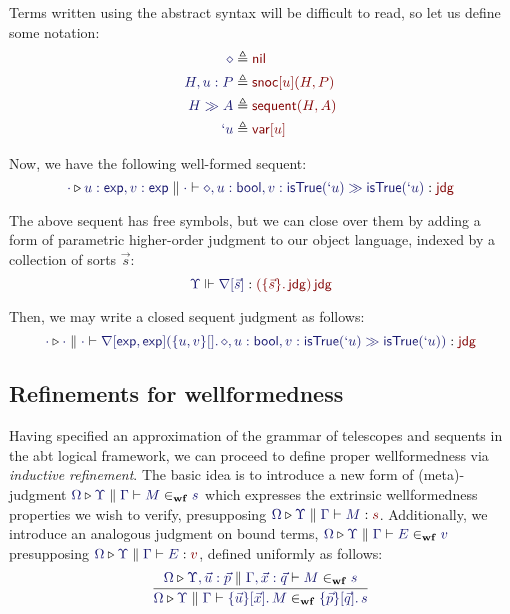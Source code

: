 \documentclass[11pt]{article}
\theoremstyle{definition}
\theoremstyle{remark}
\numberwithin{equation}{section}
\def\IModeColorName{MidnightBlue}
\def\OModeColorName{Maroon}
\newcommand\IMode[1]{{\color{\IModeColorName}{#1}}}
\newcommand\OMode[1]{{\color{\OModeColorName}{#1}}}
\newcommand\MkValence[3]{%
  \ifthenelse{\equal{#1}{}}{}{%
    \{#1\}%
  }%
  \ifthenelse{\equal{#2}{}}{}{%
    [#2]%
  }.\, #3
}
\newcommand\MkBTm[3]{\{#1\}[#2].\, #3}
\newcommand\MkArity[2]{(#1)\, #2}
\newcommand\IsOperator[3]{\IMode{#1}\Vdash \IMode{#2} : \OMode{#3}}
\newcommand\IsAbt[5]{%
  \IMode{#1}\triangleright%
  \IMode{#2}\parallel%
  \IMode{#3}\vdash%
  \IMode{#4}:\OMode{#5}%
}
\newcommand\IsWf[5]{%
  \IMode{#1}\triangleright%
  \IMode{#2}\parallel%
  \IMode{#3}\vdash%
  \IMode{#4}\in_{\mathbf{wf}}\IMode{#5}%
}
\newcommand\App[2]{#1(#2)}
\newcommand\SortExp{\mathsf{exp}}
\begin{document}
Terms written using the abstract syntax will be difficult to read, so let us
define some notation:
\begin{align*}
  \IMode{\diamond} &\triangleq \OMode{\OpNil}\\
  \IMode{H, u:P} &\triangleq \OMode{
    \App{\OpSnoc{u}}{H, P}
  }\\
  \IMode{H\gg A} &\triangleq \OMode{
    \App{\OpSequent}{
      H, A
    }
  }\\
  \IMode{`u} &\triangleq \OMode{\OpVar{u}}
\end{align*}

Now, we have the following well-formed sequent:
\[
  \IsAbt{\cdot}{
    u:\SortExp,
    v:\SortExp
  }{\cdot}{
    \diamond,u:\OpBool,v:\App{\OpSo}{`u}%
    \gg%
    \App{\OpSo}{`u}
  }{\SortJdg}
\]

\newcommand\OpNabla[1]{\nabla[#1]}

The above sequent has free symbols, but we can close over them by adding a form
of parametric higher-order judgment to our object language, indexed by a
collection of sorts $\vec{s}$:
\[
  \IsOperator{\Upsilon}{\OpNabla{\vec{s}}}{
    \MkArity{
      \MkValence{\vec{s}}{}{\SortJdg}
    }{\SortJdg}
  }
\]

Then, we may write a closed sequent judgment as follows:
\[
  \IsAbt{\cdot}{\cdot}{\cdot}{
    \App{\OpNabla{\SortExp,\SortExp}}{
      \MkBTm{u,v}{}{
        \diamond,u:\OpBool,v:\App{\OpSo}{`u}%
        \gg%
        \App{\OpSo}{`u}
      }
    }
  }{\SortJdg}
\]

\subsection{Refinements for wellformedness}

Having specified an approximation of the grammar of telescopes and sequents in
the abt logical framework, we can proceed to define proper wellformedness via
\emph{inductive refinement}. The basic idea is to introduce a new form of
(meta)-judgment $\IsWf{\Omega}{\Upsilon}{\Gamma}{M}{s}$ which expresses the
extrinsic wellformedness properties we wish to verify, presupposing
$\IsAbt{\Omega}{\Upsilon}{\Gamma}{M}{s}$. Additionally, we introduce an
analogous judgment on bound terms, $\IsWf{\Omega}{\Upsilon}{\Gamma}{E}{v}$
presupposing $\IsAbt{\Omega}{\Upsilon}{\Gamma}{E}{v}$, defined uniformly as
follows:
\[
  \infer{
    \IsWf{\Omega}{\Upsilon}{\Gamma}{
      \MkBTm{\vec{u}}{\vec{x}}{M}
    }{
      \MkValence{\vec{p}}{\vec{q}}{s}
    }
  }{
    \IsWf{\Omega}{\Upsilon,\vec{u}:\vec{p}}{\Gamma,\vec{x}:\vec{q}}{M}{s}
  }
\]
\end{document}
